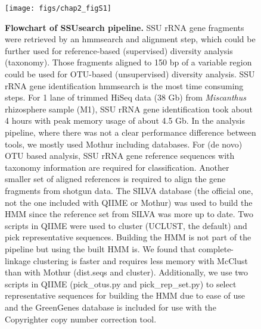 \documentclass[]{msu-thesis}
\begin{document}
\begin{figure}[tbph!]
  \centering
  \texttt{[image: figs/chap2\_figS1]}
  \caption[Flowchart of SSUsearch pipeline]{\textbf{Flowchart of SSUsearch pipeline.} SSU rRNA gene fragments were retrieved by an hmmsearch and alignment step, which could be further used for reference-based (supervised) diversity analysis (taxonomy). Those fragments aligned to 150 bp of a variable region could be used for OTU-based (unsupervised) diversity analysis. SSU rRNA gene identification hmmsearch is the most time consuming steps. For 1 lane of trimmed HiSeq data (38 Gb) from \textit{Miscanthus} rhizosphere sample (M1), SSU rRNA gene identification took about 4 hours with peak memory usage of about 4.5 Gb. In the analysis pipeline, where there was not a clear performance difference between tools, we mostly used Mothur including databases. For (de novo) OTU based analysis, SSU rRNA gene reference sequences with taxonomy information are required for classification. Another smaller set of aligned references is required to align the gene fragments from shotgun data. The SILVA database (the official one, not the one included with QIIME or Mothur) was used to build the HMM since the reference set from SILVA was more up to date. Two scripts in QIIME were used to cluster (UCLUST, the default) and pick representative sequences. Building the HMM is not part of the pipeline but using the built HMM is. We found that complete-linkage clustering is faster and requires less memory with McClust than with Mothur (dist.seqs and cluster). Additionally, we use two scripts in QIIME (pick\_otus.py and pick\_rep\_set.py) to select representative sequences for building the HMM due to ease of use and the GreenGenes database is included for use with the Copyrighter copy number correction tool.}
  \label{fig:chap2FigS1}
\end{figure}
\end{document}
